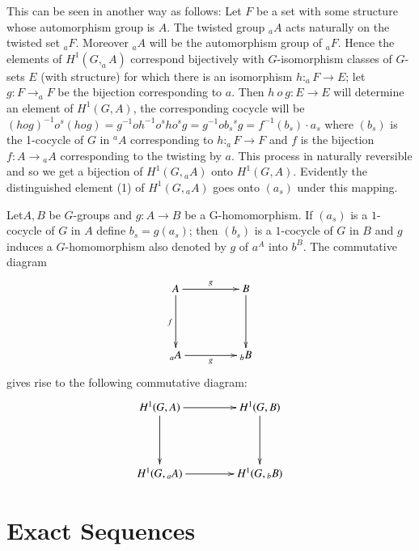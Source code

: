 This can be seen in another way as follows: Let $F$ be a set with some
structure whose automorphism group is $A$. The twisted group $_{a}A$
acts naturally on the twisted set $_{a}F$. Moreover $_{a}A$ will be
the automorphism group of $_{a}F$. Hence the elements of
$H^1(G,_{a}A)$ correspond bijectively with $G$-isomorphism classes of
$G$-sets $E$ (with structure) for which there is an isomorphism $h:
_{a}F\rightarrow E$; let $g : F \rightarrow_{a}F$ be the bijection
corresponding to $a$. Then $h~o~g : E \rightarrow E$ will determine an
element of $H^1(G,A)$, the corresponding cocycle will be
$(h o g)^{-1} o^s(h o g) = g^{-1} o h^{-1} o{}^{s}h o {}^{s}g =
g^{-1} o b_s  {}^{s}g = f^{-1}(b_s) \cdot a_s$ where $(b_s)$ is the
1-cocycle of $G$ in $^{a}A$  corresponding to $h: _{a}F \rightarrow
F$ and $f$ is the bijection $f:A \rightarrow {}_{a}A$ corresponding to
the twisting by $a$. This process in naturally reversible and so we get
a bijection of $H^1(G,{}_{a}A)$ onto $H^1(G,A)$. Evidently the
distinguished element (1) of $H^1(G,{}_{a}A)$ goes onto $(a_s)$ under
this mapping. 

Let\pageoriginale $A,B$ be $G$-groups and $g:A \rightarrow B$ be a
G-homomorphism. If $(a_s)$ is a $1$-cocycle of $G$ in $A$ define $b_s
= g(a_s)$; then $(b_s)$ is a $1$-cocycle of $G$ in $B$ and $g$ induces
a $G$-homomorphism also denoted by $g$ of $a^A$ into $b^B$. The
commutative diagram 
\[
\xymatrix@R=1.6cm@C=1.6cm{
A \ar[r]^{g} \ar[d]_f & B \ar[d]\\
{}_a A  \ar[r]_g 
& {}_b B
}
\]
gives rise to the following commutative diagram:
\[
\xymatrix@R=1.5cm@C=1.5cm{
H^1(G,A) \ar[r] \ar[d] & H^1 (G,B) \ar[d] \\
H^1 (G,{}_a A) \ar[r] & H^1 (G,{}_b B)
}
\]

\section{Exact Sequences}\label{chap1:sec1.5}

